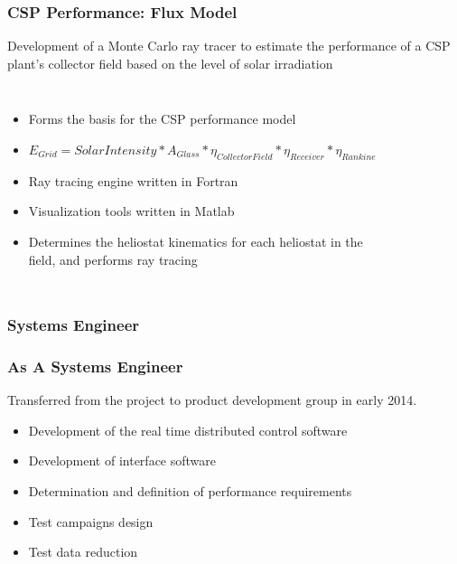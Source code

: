 \documentclass[aspectratio=169]{beamer}
\begin{document}
\begin{frame}
  \frametitle{CSP Performance: Flux Model}
  Development of a Monte Carlo ray tracer to estimate the performance
  of a CSP plant's collector field based on the level of solar
  irradiation

  \begin{columns}[t]
    \begin{itemize}
    \item Forms the basis for the CSP performance model
    \item $E_{Grid}= SolarIntensity * A_{Glass} * \eta_{CollectorField} * \eta_{Receiver} * \eta_{Rankine}$
    \item Ray tracing engine written in Fortran
    \item Visualization tools written in Matlab
    \item Determines the heliostat kinematics for each heliostat in
      the field, and performs ray tracing
    \end{itemize}

  \begin{figure}
    \includegraphics[width=\textwidth]{Flux_Image.png}
  \end{figure}
  \end{columns}
\end{frame}

\subsubsection{Systems Engineer}
\begin{frame}
  \frametitle{As A Systems Engineer}
  Transferred from the project to product development group in early 2014.
  \begin{itemize}
  \item Development of the real time distributed control software
  \item Development of interface software
  \item Determination and definition of performance requirements
  \item Test campaigns design
  \item Test data reduction
  \end{itemize}
\end{frame}
\end{document}

